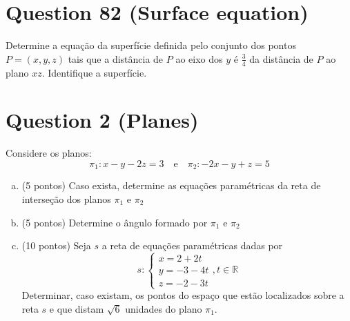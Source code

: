 \documentclass{article}
\begin{document}
\section*{Question 82 (Surface equation)}
Determine a equação da superfície definida pelo conjunto dos pontos $P = (x, y, z)$ tais que a distância de $P$ ao eixo dos $y$ é $\frac{3}{4}$ da distância de $P$ ao plano $xz$. Identifique a superfície.

\section*{Question 2 (Planes)}
Considere os planos:
\[\pi_1: x - y - 2z = 3 \quad \text{e} \quad \pi_2: -2x - y + z = 5\]

\begin{enumerate}[a)]
\item (5 pontos) Caso exista, determine as equações paramétricas da reta de interseção dos planos $\pi_1$ e $\pi_2$
\item (5 pontos) Determine o ângulo formado por $\pi_1$ e $\pi_2$
\item (10 pontos) Seja $s$ a reta de equações paramétricas dadas por
\[s: \begin{cases} x = 2 + 2t \\ y = -3 - 4t \\ z = -2 - 3t \end{cases}, t \in \mathbb{R}\]
Determinar, caso existam, os pontos do espaço que estão localizados sobre a reta $s$ e que distam $\sqrt{6}$ unidades do plano $\pi_1$.
\end{enumerate}
\end{document}

